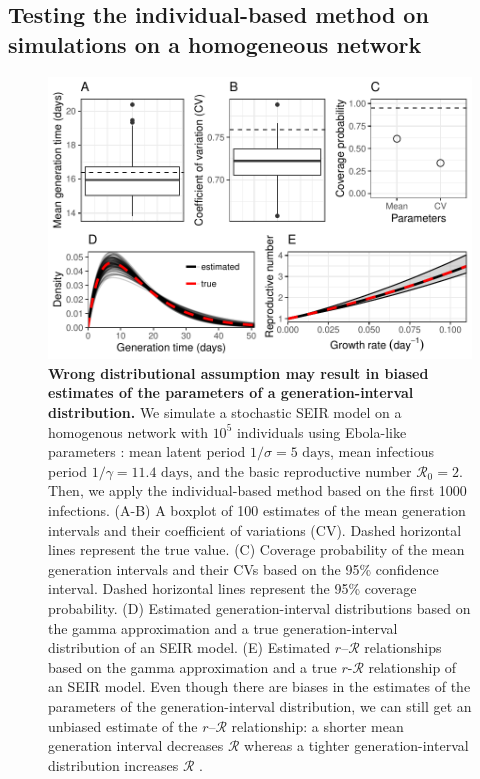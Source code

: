 \documentclass[12pt]{article}
\newcommand{\RR}{\ensuremath{{\mathcal R}}}
\begin{document}
\pagebreak

\subsection{Testing the individual-based method on simulations on a homogeneous network}

\begin{figure}[!h]
\includegraphics[width=\textwidth]{../fig/full_coverage_fig.pdf}
\caption{\textbf{Wrong distributional assumption may result in biased estimates of the parameters of a generation-interval distribution.}
We simulate a stochastic SEIR model on a homogenous network with $10^5$ individuals using Ebola-like parameters \citep{who2014ebola}: mean latent period $1/\sigma = 5 \textrm{ days}$, mean infectious period $1/\gamma = 11.4 \textrm{ days}$, and the basic reproductive number $\RR_0 = 2$. Then, we apply the individual-based method based on the first 1000 infections.
(A-B) A boxplot of 100 estimates of the mean generation intervals and their coefficient of variations (CV). 
Dashed horizontal lines represent the true value.
(C) Coverage probability of the mean generation intervals and their CVs based on the 95\% confidence interval.
Dashed horizontal lines represent the 95\% coverage probability.
(D) Estimated generation-interval distributions based on the gamma approximation and a true generation-interval distribution of an SEIR model.
(E) Estimated $r$--$\RR$ relationships based on the gamma approximation and a true $r$-$\RR$ relationship of an SEIR model.
Even though there are biases in the estimates of the parameters of the generation-interval distribution, we can still get an unbiased estimate of the $r$--$\RR$ relationship: a shorter mean generation interval decreases $\RR$ whereas a tighter generation-interval distribution increases $\RR$ \citep{wallinga2007generation, park2019practical}.
}
\label{fig:cover}
\end{figure}

\pagebreak


\end{document}

